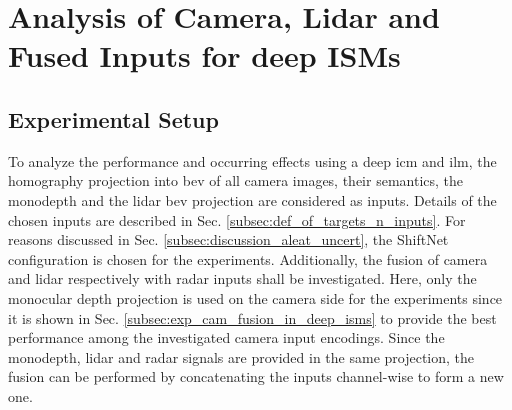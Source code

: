 \section{Analysis of Camera, Lidar and Fused Inputs for deep ISMs}
\label{sec:cam_lidar_fusion_in_deep_isms}
%
\subsection{Experimental Setup}
\label{subsec:setup_cam_lidar_fusion_in_deep_isms}
To analyze the performance and occurring effects using a deep \gls{icm} and \gls{ilm}, the homography projection into \gls{bev} of all camera images, their semantics, the \gls{monodepth} and the lidar \gls{bev} projection are considered as inputs. Details of the chosen inputs are described in Sec. \ref{subsec:def_of_targets_n_inputs}. For reasons discussed in Sec. \ref{subsec:discussion_aleat_uncert}, the ShiftNet configuration is chosen for the experiments. Additionally, the fusion of camera and lidar respectively with radar inputs shall be investigated. Here, only the monocular depth projection is used on the camera side for the experiments since it is shown in Sec. \ref{subsec:exp_cam_fusion_in_deep_isms} to provide the best performance among the investigated camera input encodings. Since the \gls{monodepth}, lidar and radar signals are provided in the same projection, the fusion can be performed by concatenating the inputs channel-wise to form a new one.\\
%

